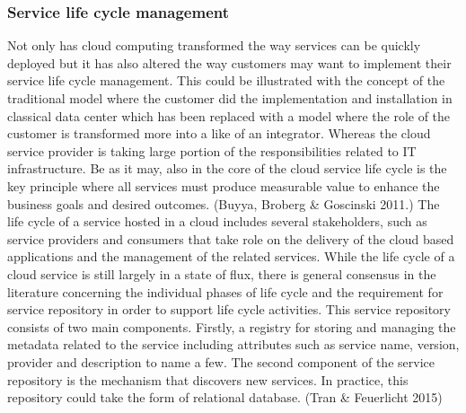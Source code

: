 \documentclass{article}
\begin{document}
\subsubsection{Service life cycle management}
Not only has cloud computing transformed the way services can be quickly deployed but it has also altered the way customers may want to implement their service life cycle management.
This could be illustrated with the concept of the traditional model where the customer did the implementation and installation in classical data center which has been replaced with a model where the role of the customer is transformed more into a like of an integrator. Whereas the cloud service provider is taking large portion of the responsibilities related to IT infrastructure. Be as it may, also in the core of the cloud service life cycle is the key principle where all services must produce measurable value to enhance the business goals and desired outcomes. (Buyya, Broberg \& Goscinski 2011.)
The life cycle of a service hosted in a cloud includes several stakeholders, such as service providers and consumers that take role on the delivery of the cloud based applications and the management of the related services. While the life cycle of a cloud service is still largely in a state of flux, there is general consensus in the literature concerning the individual phases of life cycle and the requirement for service repository in order to support life cycle activities.
This service repository consists of two main components. Firstly, a registry for storing and managing the metadata related to the service including attributes such as service name, version, provider and description to name a few. The second component of the service repository is the mechanism that discovers new services. In practice, this repository could take the form of relational database. (Tran \& Feuerlicht 2015)
\par
\end{document}
